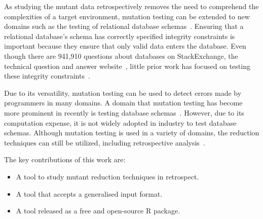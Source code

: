 
As studying the mutant data retrospectively removes the need to comprehend the complexities of a target environment,
mutation testing can be extended to new domains such as the testing of relational database
schemas~\cite{mcminn2016virtual, mcminn2015effectiveness, wright2013efficient}. Ensuring that a relational database's
schema has correctly specified integrity constraints is important because they ensure that only valid data enters the
database. Even though there are 941,910 questions about databases on StackExchange, the technical question and answer
website~\cite{stackexchange}, little prior work has focused on testing these integrity
constraints~\cite{mcminn2016virtual}.









Due to its versatility, mutation testing can be used to detect errors made by programmers in many domains.  A domain
that mutation testing has become more prominent in recently is testing database schemas~\cite{mcminn2016virtual,
mcminn2015effectiveness, wright2013efficient}. However, due to its computation expense, it is not widely adopted in
industry to test database schemas.  Although mutation testing is used in a variety of domains, the reduction techniques
can still be utilized, including retrospective analysis~\cite{jia2011analysis, wong1995reducing, offutt1993experimental,
offutt2001mutation}.

The key contributions of this work are:

    \begin{itemize}
        \item A tool to study mutant reduction techniques in retrospect.
        \item A tool that accepts a generalised input format.
        \item A tool released as a free and open-source R package.
    \end{itemize}
